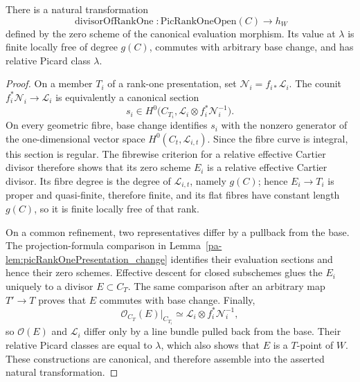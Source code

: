 \begin{definition}
  \label{pa-def:divisorOfRankOne}
  \notready
  There is a natural transformation
  \[
    \operatorname{divisorOfRankOne}\colon
      \mathrm{PicRankOneOpen}(C)\longrightarrow h_W
  \]
  defined by the zero scheme of the canonical evaluation morphism.  Its value at
  \(\lambda\) is finite locally free of degree \(g(C)\), commutes with arbitrary base change,
  and has relative Picard class \(\lambda\).
\end{definition}
\begin{proof}
  On a member \(T_i\) of a rank-one presentation, set
  \(\mathcal N_i=f_{i*}\mathcal L_i\).  The counit
  \(f_i^*\mathcal N_i\to\mathcal L_i\) is equivalently a canonical section
  \[
    s_i\in H^0\bigl(C_{T_i},
      \mathcal L_i\otimes f_i^*\mathcal N_i^{-1}\bigr).
  \]
  On every geometric fibre, base change identifies \(s_i\) with the nonzero generator of the
  one-dimensional vector space \(H^0(C_t,\mathcal L_{i,t})\).  Since the fibre curve is
  integral, this section is regular.  The fibrewise criterion for a relative effective
  Cartier divisor therefore shows that its zero scheme \(E_i\) is a relative effective
  Cartier divisor.  Its fibre degree is the degree of \(\mathcal L_{i,t}\), namely \(g(C)\);
  hence \(E_i\to T_i\) is proper and quasi-finite, therefore finite, and its flat fibres have
  constant length \(g(C)\), so it is finite locally free of that rank.

  On a common refinement, two representatives differ by a pullback from the base.  The
  projection-formula comparison in Lemma~\ref{pa-lem:picRankOnePresentation_change} identifies
  their evaluation sections and hence their zero schemes.  Effective descent for closed
  subschemes glues the \(E_i\) uniquely to a divisor \(E\subset C_T\).  The same comparison
  after an arbitrary map \(T'\to T\) proves that \(E\) commutes with base change.  Finally,
  \[
    \mathcal O_{C_T}(E)|_{C_{T_i}}
      \simeq \mathcal L_i\otimes f_i^*\mathcal N_i^{-1},
  \]
  so \(\mathcal O(E)\) and \(\mathcal L_i\) differ only by a line bundle pulled back from the
  base.  Their relative Picard classes are equal to \(\lambda\), which also shows that \(E\)
  is a \(T\)-point of \(W\).  These constructions are canonical, and therefore assemble into
  the asserted natural transformation.
\end{proof}

